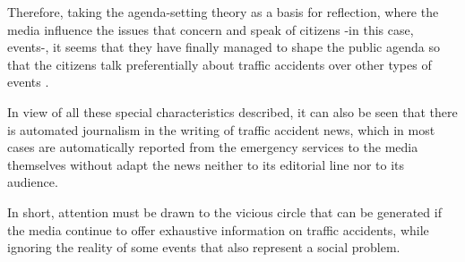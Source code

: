 Therefore, taking the agenda-setting theory as a basis for reflection,
where the media influence the issues that concern and speak of citizens
-in this case, events-, it seems that they have finally managed to shape
the public agenda so that the citizens talk preferentially about traffic
accidents over other types of events \cite{scheufele2007framing}.

In view of all these special characteristics described, it can also be
seen that there is automated journalism in the writing of traffic
accident news, which in most cases are automatically reported from the
emergency services to the media themselves without adapt the news
neither to its editorial line nor to its audience.

In short, attention must be drawn to the vicious circle that can be
generated if the media continue to offer exhaustive information on
traffic accidents, while ignoring the reality of some events that also
represent a social problem.